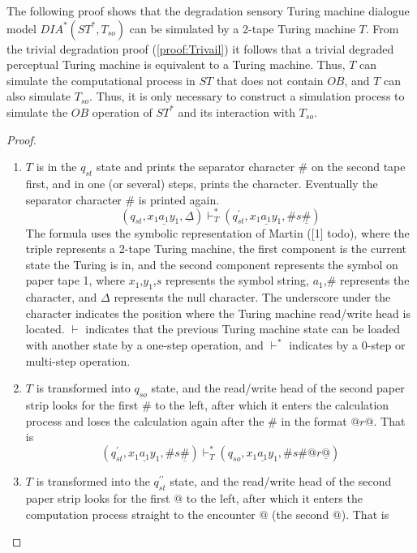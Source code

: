 The following proof shows that the degradation sensory Turing machine dialogue model $DIA^* (ST^*,T_{so})$ can be simulated by a 2-tape Turing machine $T$. From the trivial degradation proof (\ref{proof:Trivail}) it follows that a trivial degraded perceptual Turing machine is equivalent to a Turing machine. Thus, $T$ can simulate the computational process in $ST$ that does not contain $OB$, and $T$ can also simulate $T_{so}$. Thus, it is only necessary to construct a simulation process to simulate the $OB$ operation of $ST^*$ and its interaction with $T_{so}$.
\begin{proof}
\begin{enumerate}
    \item $T$ is in the $q_{st}$ state and prints the separator character $\#$ on the second tape first, and in one (or several) steps, prints the character. Eventually the separator character $\#$ is printed again.
    \begin{equation}
        (q_{st},x_1\underline{a_1}y_1, \underline{\Delta}) \vdash_T^* (q_{st}^\prime, x_1\underline{a_1}y_1, \#s\underline{\#})
    \end{equation}
    The formula uses the symbolic representation of Martin ([1] todo), where the triple represents a 2-tape Turing machine, the first component is the current state the Turing is in, and the second component represents the symbol on paper tape 1, where $x_1$,$y_1$,$s$ represents the symbol string, $a_1$,$\#$ represents the character, and $\Delta$ represents the null character. The underscore under the character indicates the position where the Turing machine read/write head is located. $\vdash$ indicates that the previous Turing machine state can be loaded with another state by a one-step operation, and $\vdash^*$ indicates by a 0-step or multi-step operation.
    \item $T$ is transformed into $q_{so}$ state, and the read/write head of the second paper strip looks for the first $\#$ to the left, after which it enters the calculation process and loses the calculation again after the $\#$ in the format $@r@$. That is
    \begin{equation}
        (q_{st}^\prime,x_1\underline{a_1}y_1,\#s\underline{\#}) \vdash_T^* (q_{so}, x_1\underline{a_1}y_1, \#s\#@r\underline{@})
    \end{equation}
    \item $T$ is transformed into the $q_{st}^{\prime\prime}$ state, and the read/write head of the second paper strip looks for the first $@$ to the left, after which it enters the computation process straight to the encounter $@$ (the second $@$). That is

\end{enumerate}
\end{proof}
